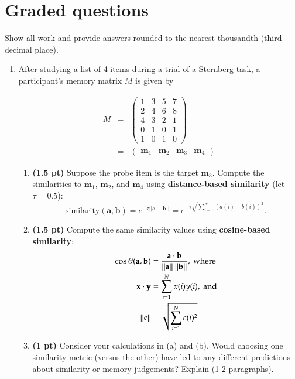\documentclass[11pt]{article}
\begin{document}
\section*{Graded questions}
Show all work and provide answers rounded to the nearest thousandth (third
decimal place).
\begin{enumerate}
\item After studying a list of 4 items during a trial of a Sternberg
  task, a participant's memory matrix $M$ is given by

\begin{eqnarray*}
M&=&
\left( 
\begin{array}{cccc}
1 & 3 & 5 & 7\\
2 & 4 & 6 & 8\\
4 & 3 & 2 & 1\\
0 & 1 & 0 & 1\\
1 & 0 & 1 & 0
\end{array} 
\right) \\
&=&
\left( 
\begin{array}{cccc}
\mathbf{m}_1 & \mathbf{m}_2 & \mathbf{m}_3 & \mathbf{m}_4  
 \end{array} 
\right) \nonumber
\end{eqnarray*}
\begin{enumerate}
\item \textbf{(1.5 pt)} Suppose the probe item is the target $\mathbf{m}_3$.  Compute
  the similarities to $\mathbf{m}_1$, $\mathbf{m}_2$, and
  $\mathbf{m}_4$ using \textbf{distance-based similarity} (let $\tau =
  0.5$):
\[
\mathrm{similarity}(\mathbf{a}, \mathbf{b}) = e^{-\tau||\mathbf{a} -
  \mathbf{b}||} = e^{-\tau\sqrt{\sum_{i=1}^N(a(i) - b(i))^2}}.
\]
\item \textbf{(1.5 pt)}  Compute the same similarity values using
  \textbf{cosine-based similarity}:
\begin{align}
\cos\theta(\mathbf{a}, \mathbf{b}) &=
\frac{\mathbf{a}\cdot\mathbf{b}}{||\mathbf{a}||~||\mathbf{b}||},~\mathrm{where}\notag\\
\mathbf{x}\cdot\mathbf{y} &= \sum_{i=1}^N x(i)y(i),~\mathrm{and}\notag\\
||\mathbf{c}|| &= \sqrt{\sum_{i=1}^N c(i)^2}\notag\\
\end{align}

\item \textbf{(1 pt)} Consider your calculations in (a) and (b).  Would
  choosing one similarity metric (versus the other) have led to any
  different predictions about similarity or memory judgements?
  Explain (1-2 paragraphs).


\end{enumerate}
\end{enumerate}
\end{document}
